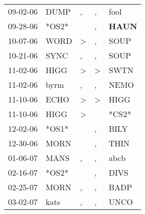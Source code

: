 \begin{supertabular}{p{0.07\textwidth}p{0.06\textwidth}p{0.02\textwidth}p{0.02\textwidth}p{0.06\textwidth}}
          09-02-06\textsuperscript{} &           DUMP\textsuperscript{} &                , &                , &           fool\textsuperscript{} \\
          09-28-06\textsuperscript{} &                            *OS2* &                  &                , &  \textbf{HAUN\textsuperscript{}} \\
          10-07-06\textsuperscript{} &           WORD\textsuperscript{} &     \textgreater &                , &           SOUP\textsuperscript{} \\
          10-21-06\textsuperscript{} &           SYNC\textsuperscript{} &                , &                , &           SOUP\textsuperscript{} \\
          11-02-06\textsuperscript{} &           HIGG\textsuperscript{} &     \textgreater &     \textgreater &           SWTN\textsuperscript{} \\
          11-02-06\textsuperscript{} &           byrm\textsuperscript{} &                , &                , &           NEMO\textsuperscript{} \\
          11-10-06\textsuperscript{} &           ECHO\textsuperscript{} &     \textgreater &     \textgreater &           HIGG\textsuperscript{} \\
          11-10-06\textsuperscript{} &           HIGG\textsuperscript{} &     \textgreater &                  &                            *CS2* \\
          12-02-06\textsuperscript{} &                            *OS1* &                  &                , &           BILY\textsuperscript{} \\
          12-30-06\textsuperscript{} &           MORN\textsuperscript{} &                  &                , &           THIN\textsuperscript{} \\
          01-06-07\textsuperscript{} &           MANS\textsuperscript{} &                , &                , &           abcb\textsuperscript{} \\
          02-16-07\textsuperscript{} &                            *OS2* &                  &                , &           DIVS\textsuperscript{} \\
          02-25-07\textsuperscript{} &           MORN\textsuperscript{} &                , &                , &           BADP\textsuperscript{} \\
          03-02-07\textsuperscript{} &           kats\textsuperscript{} &                , &                , &           UNCO\textsuperscript{} \\

\end{supertabular}
